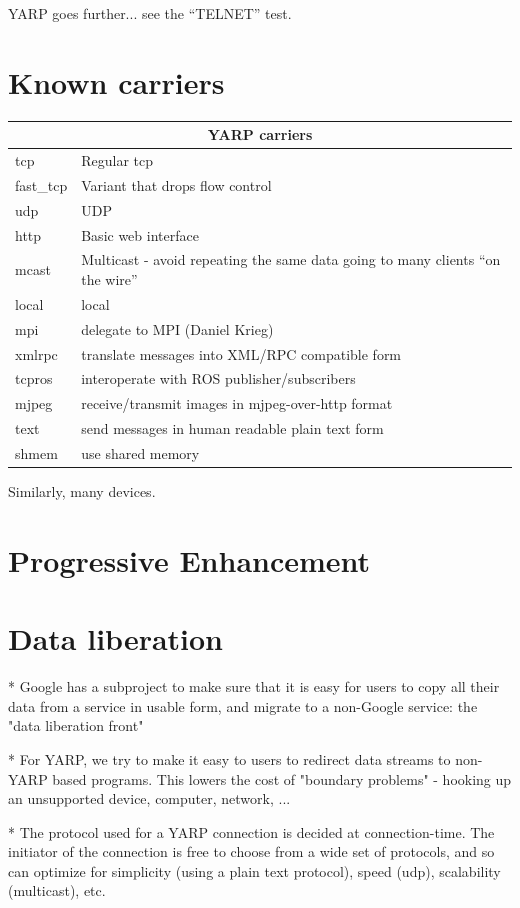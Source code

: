 \documentclass[letterpaper]{article}
\begin{document}
YARP goes further... see the ``TELNET'' test.

\section{Known carriers}

\begin{tabular}{|l|p{7cm}|}
\hline
\multicolumn{2}{|c|}{YARP carriers} \\
\hline
tcp & Regular tcp \\
fast\_tcp & Variant that drops flow control \\
udp & UDP \\
http & Basic web interface \\
mcast & Multicast - avoid repeating the same data going
to many clients ``on the wire''  \\
local & local \\
mpi & delegate to MPI (Daniel Krieg) \\
xmlrpc & translate messages into XML/RPC compatible form \\
tcpros & interoperate with ROS publisher/subscribers \\
mjpeg & receive/transmit images in mjpeg-over-http format \\
text & send messages in human readable plain text form \\
shmem & use shared memory \\
\hline
\end{tabular}

Similarly, many devices.

\section{Progressive Enhancement}

\section{Data liberation}

* Google has a subproject to make sure that it is easy for users to copy all their data from a service in usable form, and migrate to a non-Google service: the "data liberation front"

* For YARP, we try to make it easy to users to redirect data streams to non-YARP based programs.  This lowers the cost of "boundary problems" - hooking up an unsupported device, computer, network, ...

* The protocol used for a YARP connection is decided at connection-time.  The initiator of the connection is free to choose from a wide set of protocols, and so can optimize for simplicity (using a plain text protocol), speed (udp), scalability (multicast), etc.  
\end{document}
